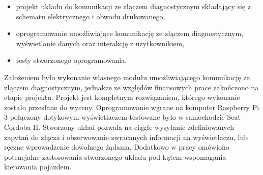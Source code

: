 \documentclass[12pt, twoside]{article} %
\numberwithin{equation}{subsection}
\numberwithin{figure}{section}
\numberwithin{table}{section}
\begin{document}
	\begin{itemize}
		\item{projekt układu do komunikacji ze złączem diagnostycznym składający się z schematu elektrycznego i obwodu drukowanego,}
		\item{oprogramowanie umożliwiające komunikację ze złączem diagnostycznym, wyświetlanie danych oraz interakcję z użytkownikiem,}
		\item{testy stworzonego oprogramowania.}
	\end{itemize}
	
	Założeniem było wykonanie własnego modułu umożliwiającego komunikację ze złączem diagnostycznym, jednakże ze względów finansowych prace zakończono na etapie projektu. Projekt jest kompletnym rozwiązaniem, którego wykonanie zostało przesłane do wyceny. Oprogramowanie wgrane na komputer Raspberry Pi 3 połączony dotykowym wyświetlaczem testowane było w samochodzie Seat Cordoba II. Stworzony układ pozwala na ciągłe wysyłanie zdefiniowanych zapytań do złącza i obserwowanie zwracanych informacji na wyświetlaczu, lub ręczne wprowadzenie dowolnego żądania. Dodatkowo w pracy omówiono potencjalne zastosowania stworzonego układu pod kątem wspomagania kierowania pojazdem. 
	
	\newpage	
	
\end{document}
